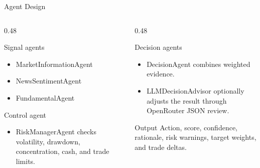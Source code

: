 \documentclass[aspectratio=169]{beamer}
\begin{document}
\begin{frame}{Agent Design}
  \begin{columns}
    \begin{column}{0.48\linewidth}
      \begin{block}{Signal agents}
        \begin{itemize}
          \item MarketInformationAgent
          \item NewsSentimentAgent
          \item FundamentalAgent
        \end{itemize}
      \end{block}
      \begin{block}{Control agent}
        \begin{itemize}
          \item RiskManagerAgent checks volatility, drawdown, concentration, cash, and trade limits.
        \end{itemize}
      \end{block}
    \end{column}
    \begin{column}{0.48\linewidth}
      \begin{block}{Decision agents}
        \begin{itemize}
          \item DecisionAgent combines weighted evidence.
          \item LLMDecisionAdvisor optionally adjusts the result through OpenRouter JSON review.
        \end{itemize}
      \end{block}
      \begin{block}{Output}
        Action, score, confidence, rationale, risk warnings, target weights, and trade deltas.
      \end{block}
    \end{column}
  \end{columns}
\end{frame}
\end{document}
